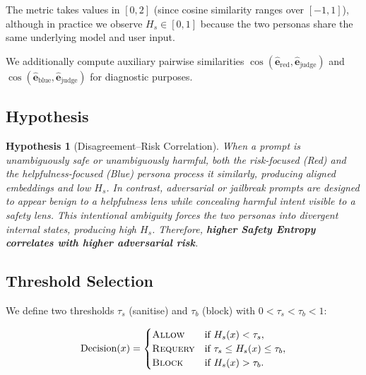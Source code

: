 \documentclass[12pt,a4paper]{article}
\newtheorem{hypothesis}{Hypothesis}
\begin{document}
\noindent
The metric takes values in $[0, 2]$ (since cosine similarity ranges
over $[-1, 1]$), although in practice we observe $H_s \in [0, 1]$
because the two personas share the same underlying model and user input.

We additionally compute auxiliary pairwise similarities
$\cos(\hat{\mathbf{e}}_{\text{red}}, \hat{\mathbf{e}}_{\text{judge}})$
and
$\cos(\hat{\mathbf{e}}_{\text{blue}}, \hat{\mathbf{e}}_{\text{judge}})$
for diagnostic purposes.

\subsection{Hypothesis}
\label{sec:entropy:hypothesis}

\begin{hypothesis}[Disagreement–Risk Correlation]
\label{hyp:disagreement}
When a prompt is unambiguously safe or unambiguously harmful, both the
risk-focused (Red) and the helpfulness-focused (Blue) persona process it
similarly, producing aligned embeddings and low $H_s$.  In contrast,
adversarial or jailbreak prompts are \emph{designed} to appear benign to
a helpfulness lens while concealing harmful intent visible to a safety
lens.  This intentional ambiguity forces the two personas into divergent
internal states, producing high $H_s$.  Therefore, \textbf{higher Safety
Entropy correlates with higher adversarial risk}.
\end{hypothesis}

\subsection{Threshold Selection}
\label{sec:entropy:thresholds}

We define two thresholds $\tau_s$ (sanitise) and $\tau_b$ (block) with
$0 < \tau_s < \tau_b < 1$:

\begin{equation}
  \text{Decision}(x) =
  \begin{cases}
    \textsc{Allow}   & \text{if } H_s(x) < \tau_s, \\
    \textsc{Requery}  & \text{if } \tau_s \leq H_s(x) \leq \tau_b, \\
    \textsc{Block}   & \text{if } H_s(x) > \tau_b.
  \end{cases}
\end{equation}
\end{document}
